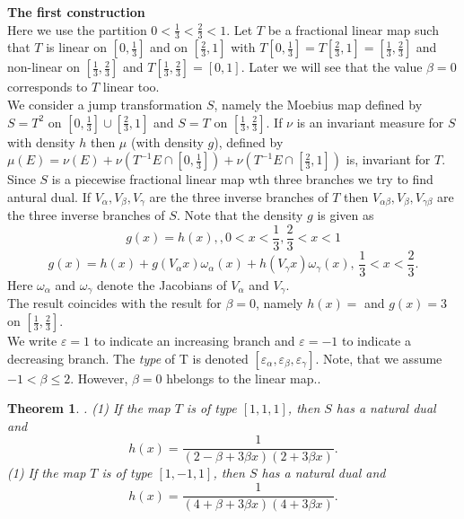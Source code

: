 \documentclass[12pt]{article}
\newtheorem{theorem}{Theorem}
\begin{document}
{\bf The first construction}\\
 
Here we use the partition $0 < \frac{1}{3}
< \frac{2}{3} < 1$. Let $T$ be a fractional linear map  such that $T$ is linear on $[0, \frac{1}3]$ and on $[\frac{2}{3},1]$ with $T[0, \frac{1}3] = T[\frac{2}{3}, 1]= [\frac{1}3, \frac{2}{3}]$ and non-linear on $[\frac{1}{3}, \frac{2}{3}]$ and $T[\frac{1}{3}, \frac{2}{3}]= [0, 1]$. Later we will see that the value $\beta = 0$ corresponds to $T$ linear too. \\
We consider a jump transformation $S$, namely  the Moebius map  defined by $S = T^2$ on $[0, \frac{1}{3}] \cup [\frac{2}{3}, 1]$ and $S=T$ on $[\frac{1}{3}, \frac{2}{3}]$.
 If $\nu$ is an invariant measure for $S$ with density $h$  then $\mu$ (with density $g$),  defined by $\mu(E)= \nu (E)+ \nu(T^{-1}E \cap [0,\frac{1}{3}]) + \nu(T^{-1}E \cap  [\frac{2}{3},1])$ is, invariant for $T$.\\
 Since $S$ is a piecewise fractional linear map wth three branches we try to find antural dual. If $V_\alpha, V_\beta, V_\gamma$ are the three inverse branches of $T$ then $V_{\alpha \beta}, V_\beta, V_{\gamma \beta}$ are the three inverse branches of $S$. Note that the density $g$ is given as
 $$g(x) = h(x), , 0 < x < \frac{1}{3} , \frac{2}{3} < x < 1$$
 $$g(x)= h(x)+ g(V_\alpha x)\omega_\alpha (x) + h(V_\gamma x)\omega_\gamma (x), \, \frac{1}{3} < x <  \frac{2}{3}  .$$
Here $\omega_\alpha$ and $\omega_\gamma$ denote the Jacobians of $V_\alpha$ and $V_\gamma$.\\
 The result coincides with the result for $\beta = 0$, namely $h(x)=	$ and $g(x)= 3$ on $[\frac{1}{3},  \frac{2}{3}].$ \\
 We write $\varepsilon = 1 $ to indicate an increasing branch and $\varepsilon =-1$ to indicate a decreasing branch. The {\em type} of T is denoted $[\varepsilon_\alpha, \varepsilon_\beta, \varepsilon_\gamma]$. Note, that we assume $-1 < \beta \leq 2$. However,  $\beta = 0$ hbelongs to  the linear map..\\

\begin{theorem} . 
	(1) If the map $T$ is of type $[1,1,1]$, then  $S$ has a natural dual and 
	$$ h(x) = \frac{1}{(2 - \beta + 3 \beta x) (2 + 3 \beta x )}.$$
	(1) If the map $T$ is of type $[1,-1,1]$, then  $S$ has a natural dual and 
$$ h(x) = \frac{1}{(4+ \beta + 3 \beta x) (4 + 3 \beta x )}.$$
\end{theorem}
\end{document}
